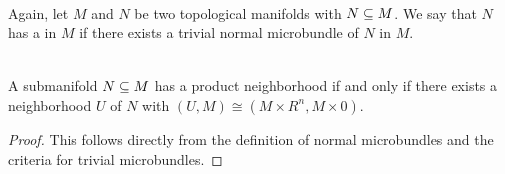  \\
Again, let $M$ and $N$ be two topological manifolds with $N \subseteq{} M$.
We say that $N$ has a  in $M$ if
there exists a trivial normal microbundle of $N$ in $M$.

 \\
A submanifold $N \subseteq{} M$ has a product neighborhood if and only if there exists a neighborhood $U$ of $N$ with $(U, M) \cong (M \times R^n, M \times 0)$.
\begin{proof}
This follows directly from the definition of normal microbundles and the criteria for trivial microbundles.
\end{proof}